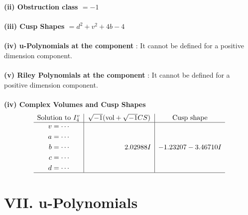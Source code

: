 \documentclass[1p]{elsarticle_modified}
\theoremstyle{definition}
\newcommand{\I}{\sqrt{-1}}
\begin{document}
\flushleft \textbf{(ii) Obstruction class $= -1$}\\~\\
\flushleft \textbf{(iii) Cusp Shapes $= d^2+v^2+4 b-4$}\\~\\
\flushleft \textbf{(iv) u-Polynomials at the component} : It cannot be defined for a positive dimension component.\\~\\
\flushleft \textbf{(v) Riley Polynomials at the component} : It cannot be defined for a positive dimension component.\\~\\
\newpage\flushleft \textbf{(iv) Complex Volumes and Cusp Shapes}
$$\begin{array}{c|c|c} 
\text{Solution to }I^v_{4}& \I (\text{vol} + \sqrt{-1}CS) & \text{Cusp shape}\\
 \hline 
\begin{aligned}
v &= \cdots \\
a &= \cdots \\
b &= \cdots \\
c &= \cdots \\
d &= \cdots\end{aligned}
 & \phantom{-0.000000 -}2.02988 I & -1.23207 - 3.46710 I\\
 \hline 
 \end{array}
$$
\newpage\renewcommand{\arraystretch}{1}
\centering \section*{ VII. u-Polynomials}
\end{document}

